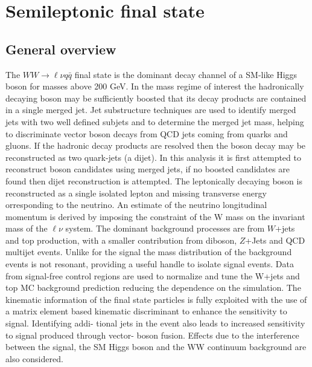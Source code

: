 \chapter{Semileptonic final state}

\section{General overview}
The $WW \to \ell \nu q \bar{q}$ final state is the dominant decay channel of a SM-like Higgs boson for masses above 200 GeV.
In the mass regime of interest the hadronically decaying boson may be sufficiently boosted that
its decay products are contained in a single merged jet. Jet substructure techniques are used
to identify merged jets with two well defined subjets and to determine the merged jet mass,
helping to discriminate vector boson decays from QCD jets coming from quarks and gluons. If
the hadronic decay products are resolved then the boson decay may be reconstructed as two
quark-jets (a dijet). In this analysis it is first attempted to reconstruct boson candidates using
merged jets, if no boosted candidates are found then dijet reconstruction is attempted.
The leptonically decaying boson is reconstructed as a single isolated lepton and missing transverse energy
orresponding to the neutrino. An estimate of the neutrino longitudinal
momentum is derived by imposing the constraint of the W mass on the invariant mass of the $\ell \nu$ system.
The dominant background processes
are from $W$+jets and top production, with a smaller contribution from diboson, $Z$+Jets and
QCD multijet events. Unlike for the signal the mass distribution of the background events is
not resonant, providing a useful handle to isolate signal events. Data from signal-free control
regions are used to normalize and tune the W+jets and top MC background prediction reducing
the dependence on the simulation.
The kinematic information of the final state particles is fully exploited with the use of a matrix
element based kinematic discriminant to enhance the sensitivity to signal. Identifying addi-
tional jets in the event also leads to increased sensitivity to signal produced through vector-
boson fusion. Effects due to the interference between the signal, the SM Higgs boson and
the WW continuum background are also considered.

